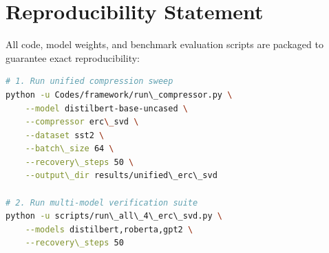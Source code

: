 \section{Reproducibility Statement}
All code, model weights, and benchmark evaluation scripts are packaged to guarantee exact reproducibility:
\begin{lstlisting}[language=bash]
# 1. Run unified compression sweep
python -u Codes/framework/run\_compressor.py \
    --model distilbert-base-uncased \
    --compressor erc\_svd \
    --dataset sst2 \
    --batch\_size 64 \
    --recovery\_steps 50 \
    --output\_dir results/unified\_erc\_svd

# 2. Run multi-model verification suite
python -u scripts/run\_all\_4\_erc\_svd.py \
    --models distilbert,roberta,gpt2 \
    --recovery\_steps 50
\end{lstlisting}
